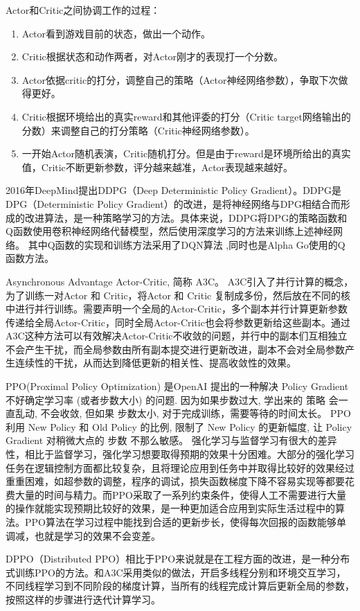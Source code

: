 Actor和Critic之间协调工作的过程：
\begin{enumerate}
  \item Actor看到游戏目前的状态，做出一个动作。
  \item Critic根据状态和动作两者，对Actor刚才的表现打一个分数。
  \item Actor依据critic的打分，调整自己的策略（Actor神经网络参数），争取下次做得更好。
  \item Critic根据环境给出的真实reward和其他评委的打分（Critic target网络输出的分数）来调整自己的打分策略（Critic神经网络参数）。
  \item 一开始Actor随机表演，Critic随机打分。但是由于reward是环境所给出的真实值，Critic不断更新参数，评分越来越准，Actor表现越来越好。
\end{enumerate}

2016年DeepMind提出DDPG\cite{Lillicrap2015Continuous}（Deep Deterministic Policy Gradient）。DDPG是DPG（Deterministic Policy Gradient）的改进，是将神经网络与DPG相结合而形成的改进算法，是一种策略学习的方法。具体来说，DDPG将DPG的策略函数和Q函数使用卷积神经网络代替模型，然后使用深度学习的方法来训练上述神经网络。
其中Q函数的实现和训练方法采用了DQN算法 ,同时也是Alpha Go使用的Q函数方法。

Asynchronous Advantage Actor-Critic\cite{mnih2016asynchronous}, 简称 A3C。
A3C引入了并行计算的概念，为了训练一对Actor 和 Critic，将Actor 和 Critic 复制成多份，然后放在不同的核中进行并行训练。需要声明一个全局的Actor-Critic，多个副本并行计算更新参数传递给全局Actor-Critic，同时全局Actor-Critic也会将参数更新给这些副本。通过A3C这种方法可以有效解决Actor-Critic不收敛的问题，并行中的副本们互相独立不会产生干扰，而全局参数由所有副本提交进行更新改进，副本不会对全局参数产生连续性的干扰，从而达到降低更新的相关性、提高收敛性的效果。

PPO(Proximal Policy Optimization)\cite{schulman2017proximal} 是OpenAI 提出的一种解决 Policy Gradient 不好确定学习率 (或者步数大小) 的问题. 因为如果步数过大, 学出来的 策略 会一直乱动, 不会收敛, 但如果 步数太小, 对于完成训练，需要等待的时间太长。 PPO 利用 New Policy 和 Old Policy 的比例, 限制了 New Policy 的更新幅度, 让 Policy Gradient 对稍微大点的 步数 不那么敏感。
强化学习与监督学习有很大的差异性，相比于监督学习，强化学习想要取得预期的效果十分困难。大部分的强化学习任务在逻辑控制方面都比较复杂，且将理论应用到任务中并取得比较好的效果经过重重困难，如超参数的调整，程序的调试，损失函数梯度下降不容易实现等都要花费大量的时间与精力。而PPO采取了一系列约束条件，使得人工不需要进行大量的操作就能实现预期比较好的效果，是一种更加适合应用到实际生活过程中的算法。PPO算法在学习过程中能找到合适的更新步长，使得每次回报的函数能够单调减，也就是学习的效果不会变差。

DPPO（Distributed PPO）\cite{heess2017emergence}相比于PPO来说就是在工程方面的改进，是一种分布式训练PPO的方法。和A3C采用类似的做法，开启多线程分别和环境交互学习，不同线程学习到不同阶段的梯度计算，当所有的线程完成计算后更新全局的参数，按照这样的步骤进行迭代计算学习。

